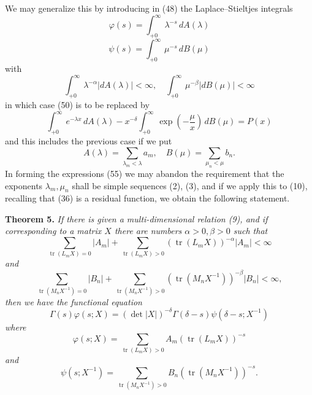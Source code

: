 \documentclass[12pt]{article}
\begin{document}
We may generalize this by introducing in (48) the Laplace–Stieltjes integrals
\begin{equation}
\varphi(s) = \int_{+0}^{\infty} \lambda^{-s} \, dA(\lambda)
\tag{51}
\end{equation}
\begin{equation}
\psi(s) = \int_{+0}^{\infty} \mu^{-s} \, dB(\mu)
\tag{52}
\end{equation}
with
\begin{equation}
\int_{+0}^{\infty} \lambda^{-\alpha} |dA(\lambda)| < \infty, \quad \int_{+0}^{\infty} \mu^{-\beta} |dB(\mu)| < \infty
\tag{53}
\end{equation}
in which case (50) is to be replaced by
\begin{equation}
\int_{+0}^{\infty} e^{-\lambda x} \, dA(\lambda) - x^{-\delta} \int_{+0}^{\infty} \exp \left( -\frac{\mu}{x} \right) \, dB(\mu) = P(x)
\tag{54}
\end{equation}
and this includes the previous case if we put
\begin{equation}
A(\lambda) = \sum_{\lambda_m < \lambda} a_m, \quad B(\mu) = \sum_{\mu_n < \mu} b_n.
\tag{55}
\end{equation}
In forming the expressions (55) we may abandon the requirement that the exponents \(\lambda_m, \mu_n\) shall be simple sequences (2), (3), and if we apply this to (10), recalling that (36) is a residual function, we obtain the following statement.

\medskip

\noindent\textbf{Theorem 5.} \emph{If there is given a multi-dimensional relation (9), and if corresponding to a matrix \(X\) there are numbers \(\alpha > 0, \beta > 0\) such that}
\begin{equation}
\sum_{\operatorname{tr}(L_m X)=0} |A_m| + \sum_{\operatorname{tr}(L_m X)>0} (\operatorname{tr}(L_m X))^{-\alpha} |A_m| < \infty
\tag{56}
\end{equation}
\emph{and}
\begin{equation}
\sum_{\operatorname{tr}(M_n X^{-1})=0} |B_n| + \sum_{\operatorname{tr}(M_n X^{-1})>0} (\operatorname{tr}(M_n X^{-1}))^{-\beta} |B_n| < \infty,
\tag{57}
\end{equation}
\emph{then we have the functional equation}
\begin{equation}
\Gamma(s)\varphi(s; X) = (\det |X|)^{-\delta} \Gamma(\delta - s)\psi(\delta - s; X^{-1})
\tag{58}
\end{equation}
\emph{where}
\begin{equation}
\varphi(s; X) = \sum_{\operatorname{tr}(L_m X)>0} A_m (\operatorname{tr}(L_m X))^{-s}
\tag{59}
\end{equation}
\emph{and}
\begin{equation}
\psi(s; X^{-1}) = \sum_{\operatorname{tr}(M_n X^{-1})>0} B_n (\operatorname{tr}(M_n X^{-1}))^{-s}.
\tag{60}
\end{equation}
\end{document}

